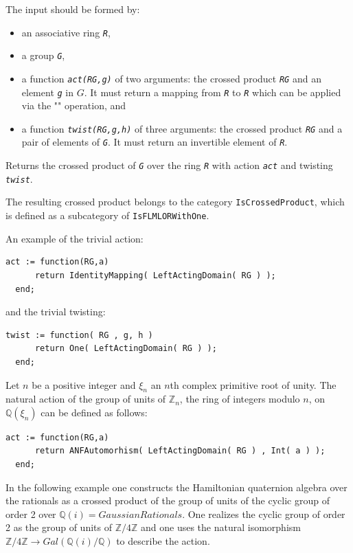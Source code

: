 \documentclass[a4paper,11pt]{report}
\begin{document}
{{{ The input should be formed by: 
\begin{itemize}
\item an associative ring \mbox{\texttt{\mdseries\slshape R}}, 
\item a group \mbox{\texttt{\mdseries\slshape G}}, 
\item a function \mbox{\texttt{\mdseries\slshape act(RG,g)}} of two arguments: the crossed product \mbox{\texttt{\mdseries\slshape RG}} and an element \mbox{\texttt{\mdseries\slshape g}} in $G$. It must return a mapping from \mbox{\texttt{\mdseries\slshape R}} to \mbox{\texttt{\mdseries\slshape R}} which can be applied via the "\texttt{\texttt{}\texttt{}}" operation, and 
\item a function \mbox{\texttt{\mdseries\slshape twist(RG,g,h)}} of three arguments: the crossed product \mbox{\texttt{\mdseries\slshape RG}} and a pair of elements of \mbox{\texttt{\mdseries\slshape G}}. It must return an invertible element of \mbox{\texttt{\mdseries\slshape R}}. 
\end{itemize}
 Returns the crossed product of \mbox{\texttt{\mdseries\slshape G}} over the ring \mbox{\texttt{\mdseries\slshape R}} with action \mbox{\texttt{\mdseries\slshape act}} and twisting \mbox{\texttt{\mdseries\slshape twist}}. 

 The resulting crossed product belongs to the category  \texttt{IsCrossedProduct}, which is defined as a subcategory of \texttt{IsFLMLORWithOne}. 

 An example of the trivial action: 
\begin{Verbatim}[commandchars=!@|,fontsize=\small,frame=single,label=Example]
  act := function(RG,a)
      return IdentityMapping( LeftActingDomain( RG ) );
  end;
\end{Verbatim}
 and the trivial twisting: 
\begin{Verbatim}[commandchars=!@|,fontsize=\small,frame=single,label=Example]
  twist := function( RG , g, h )
      return One( LeftActingDomain( RG ) );
  end;
\end{Verbatim}
 Let $n$ be a positive integer and $\xi_n$ an $n$\texttt{}th complex primitive root of unity. The natural action of
the group of units of ${\ensuremath{\mathbb Z}}_n$, the ring of integers modulo $n$, on ${\ensuremath{\mathbb Q}} (\xi_n)$ can be defined as follows: 
\begin{Verbatim}[commandchars=!@|,fontsize=\small,frame=single,label=Example]
  act := function(RG,a)
      return ANFAutomorhism( LeftActingDomain( RG ) , Int( a ) );
  end;
\end{Verbatim}
 In the following example one constructs the Hamiltonian quaternion algebra
over the rationals as a crossed product of the group of units of the cyclic
group of order 2 over ${\ensuremath{\mathbb Q}} (i)=GaussianRationals$. One realizes the cyclic group of order 2 as the group of units of ${\ensuremath{\mathbb Z}} / 4 {\ensuremath{\mathbb Z}}$ and one uses the natural isomorphism ${\ensuremath{\mathbb Z}} / 4 {\ensuremath{\mathbb Z}} \rightarrow Gal(
{\ensuremath{\mathbb Q}} (i)/ {\ensuremath{\mathbb Q}} )$ to describe the action. 

}}}
\end{document}
